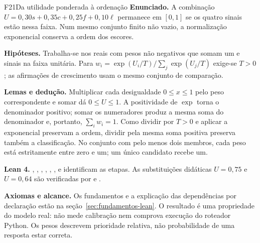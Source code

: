 \begin{formalizacao}{F21}{Da utilidade ponderada à ordenação}
\textbf{Enunciado.} A combinação
$U=0{,}30s+0{,}35c+0{,}25f+0{,}10\ell$ permanece em $[0,1]$
se os quatro sinais estão nessa faixa. Num mesmo conjunto finito não vazio,
a normalização exponencial conserva a ordem dos escores.

\textbf{Hipóteses.} Trabalha-se nos reais com pesos não negativos que somam
um e sinais na faixa unitária. Para
$w_i=\exp(U_i/T)/\sum_j\exp(U_j/T)$ exige-se $T>0$;
as afirmações de crescimento usam o mesmo conjunto de comparação.

\textbf{Lemas e dedução.} Multiplicar cada desigualdade $0\leq x\leq1$
pelo peso correspondente e somar dá $0\leq U\leq1$. A positividade de
$\exp$ torna o denominador positivo; somar os numeradores produz a mesma
soma do denominador e, portanto, $\sum_iw_i=1$. Como dividir por $T>0$ e
aplicar a exponencial preservam a ordem, dividir pela mesma soma positiva
preserva também a classificação. No conjunto com pelo menos dois membros,
cada peso está estritamente entre zero e um; um único candidato recebe um.

\textbf{Lean 4.} ,
,
,
,
,
,
 e
 identificam as etapas.
As substituições didáticas $U=0{,}75$ e $U=0{,}64$ são verificadas por
 e
.

\textbf{Axiomas e alcance.} Os fundamentos e a explicação das dependências por
declaração estão na seção~\ref{sec:fundamentos-lean}. O resultado é uma
propriedade do modelo real: não mede calibração nem comprova execução do
roteador Python. Os pesos descrevem prioridade relativa, não probabilidade
de uma resposta estar correta.
\end{formalizacao}

